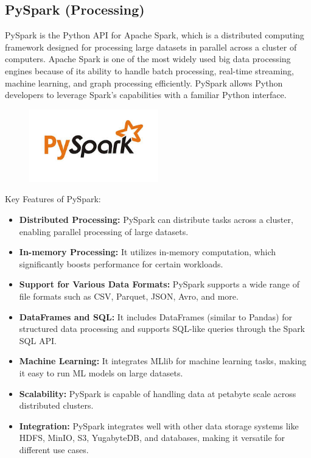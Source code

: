 \documentclass[12pt,a4paper]{article}
\begin{document}
\subsection{PySpark (Processing)}
PySpark is the Python API for Apache Spark, which is a distributed computing framework designed for processing large datasets in parallel across a cluster of computers. Apache Spark is one of the most widely used big data processing engines because of its ability to handle batch processing, real-time streaming, machine learning, and graph processing efficiently. PySpark allows Python developers to leverage Spark’s capabilities with a familiar Python interface.
\begin{figure}[H]
    \begin{center}
        \includegraphics[width=0.5\textwidth]{Images/pySpark.png}
    \end{center}
\end{figure}
Key Features of PySpark:
\begin{itemize}
    \item \textbf{Distributed Processing:} PySpark can distribute tasks across a cluster, enabling parallel processing of large datasets.
    \item \textbf{In-memory Processing:} It utilizes in-memory computation, which significantly boosts performance for certain workloads.
    \item \textbf{Support for Various Data Formats:} PySpark supports a wide range of file formats such as CSV, Parquet, JSON, Avro, and more.
    \item \textbf{DataFrames and SQL:} It includes DataFrames (similar to Pandas) for structured data processing and supports SQL-like queries through the Spark SQL API.
    \item \textbf{Machine Learning:} It integrates MLlib for machine learning tasks, making it easy to run ML models on large datasets.
    \item \textbf{Scalability:} PySpark is capable of handling data at petabyte scale across distributed clusters.
    \item \textbf{Integration:} PySpark integrates well with other data storage systems like HDFS, MinIO, S3, YugabyteDB, and databases, making it versatile for different use cases.
\end{itemize}
\end{document}
